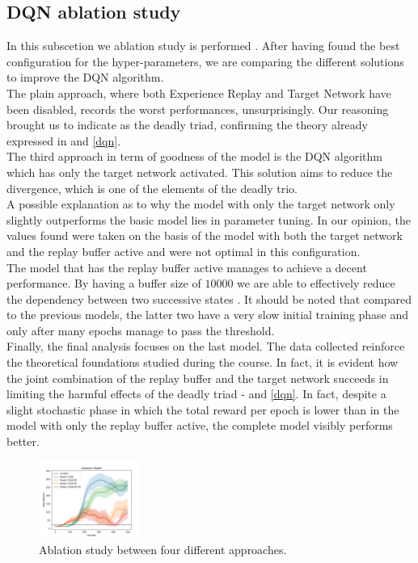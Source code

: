 \documentclass{article}
\begin{document}
\subsection{DQN ablation study}
\label{subsec:dqn-ablation-study}
In this subscetion we ablation study is performed \cite{fig_ablation}. After having found the best configuration for the hyper-parameters, we are comparing the different solutions to improve the DQN algorithm.\\
The plain approach, where both Experience Replay and Target Network have been disabled, records the worst performances, unsurprisingly. 
Our reasoning brought us to indicate as the deadly triad, confirming the theory already expressed in \cite{DBLP:books/sp/Plaat22} and \autoref{dqn}.\\
The third approach in term of goodness of the model is the DQN algorithm which has only the target network activated. 
This solution aims to reduce the divergence, which is one of the elements of the deadly trio. \\
A possible explanation as to why the model with only the target network only slightly outperforms the basic model lies in parameter tuning. 
In our opinion, the values found were taken on the basis of the model with both the target network and the replay buffer active and were not optimal in this configuration. \\
The model that has the replay buffer active manages to achieve a decent performance. By having a buffer size of $10000$ we are able to effectively reduce the dependency between two successive states \cite{DBLP:books/sp/Plaat22}. 
It should be noted that compared to the previous models, the latter two have a very slow initial training phase and only after many epochs manage to pass the threshold.\\
Finally, the final analysis focuses on the last model. The data collected reinforce the theoretical foundations studied during the course. 
In fact, it is evident how the joint combination of the replay buffer and the target network succeeds in limiting the harmful effects of the deadly triad -  \cite{DBLP:books/sp/Plaat22} and \autoref{dqn}. 
In fact, despite a slight stochastic phase in which the total reward per epoch is lower than in the model with only the replay buffer active, the complete model visibly performs better. \\

\begin{figure}[ht!]
   \centering
   \includegraphics[width=0.3\textwidth]{assets/Ablation/ablation_study.png}
   \caption{Ablation study between four different approaches. 
   }
   \label{fig_ablation}
\end{figure}
\end{document}

